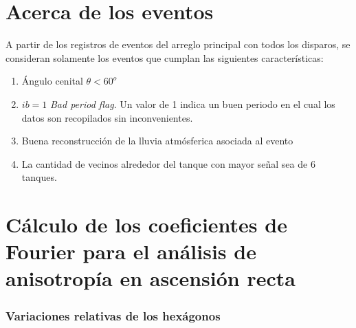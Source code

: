 \section{Acerca de los eventos} \label{filtro}

A partir de los registros de eventos del arreglo principal con todos los disparos, se consideran solamente los eventos que cumplan las siguientes características:

    \begin{enumerate}
      \item Ángulo cenital $\theta < 60^o$
      \item $ib=1$ \emph{Bad period flag}. Un valor de 1 indica un buen periodo en el cual los datos son recopilados sin inconvenientes.
      \item Buena reconstrucción de la lluvia atmósferica asociada al evento
      \item La cantidad de vecinos alrededor del tanque con mayor señal sea de 6 tanques.
    \end{enumerate}
   
\section{Cálculo de los coeficientes de Fourier para el análisis de anisotropía en ascensión recta}

  \subsubsection{Variaciones relativas de los hexágonos} \label{peso_hexagonos}

